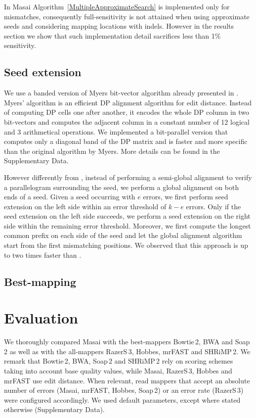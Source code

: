 In Masai Algorithm~\ref{MultipleApproximateSearch} is implemented only for mismatches, consequently full-sensitivity is not attained when using approximate seeds and considering mapping locations with indels.
However in the results section we show that such implementation detail sacrifices less than 1\% sensitivity.

\subsection{Seed extension}

We use a banded version of Myers bit-vector algorithm \citep{Myers1999} already presented in \citep{Razers3}.
Myers' algorithm is an efficient DP alignment algorithm \citep{Needleman1970} for edit distance. 
Instead of computing DP cells one after another, it encodes the whole DP column in two bit-vectors and computes the adjacent column in a constant number of 12 logical and 3 arithmetical operations.
We implemented a bit-parallel version that computes only a diagonal band of the DP matrix and is faster and more specific than the original algorithm by Myers.
More details can be found in the Supplementary Data.

However differently from \citep{Razers3}, instead of performing a semi-global alignment to verify a parallelogram surrounding the seed, we perform a global alignment on both ends of a seed.
Given a seed occurring with $e$ errors, we first perform seed extension on the left side within an error threshold of $k - e$ errors.
Only if the seed extension on the left side succeeds, we perform a seed extension on the right side within the remaining error threshold.
Moreover, we first compute the longest common prefix on each side of the seed and let the global alignment algorithm start from the first mismatching positions.
We observed that this approach is up to two times faster than \citep{Razers3}.

\subsection{Best-mapping}


\section{Evaluation}

We thoroughly compared Masai with the best-mappers Bowtie\,2, BWA and Soap\,2 as well as with the all-mappers RazerS\,3, Hobbes, mrFAST and SHRiMP\,2.
We remark that Bowtie\,2, BWA, Soap\,2 and SHRiMP\,2 rely on scoring schemes taking into account base quality values, while Masai, RazerS\,3, Hobbes and mrFAST use edit distance.
When relevant, read mappers that accept an absolute number of errors (Masai, mrFAST, Hobbes, Soap\,2) or an error rate (RazerS\,3) were configured accordingly.
We used default parameters, except where stated otherwise (Supplementary Data).

